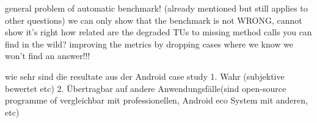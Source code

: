 general problem of automatic benchmark! (already mentioned but still applies to other questions)
    we can only show that the benchmark is not WRONG, cannot show it's right
how related are the degraded TUs to missing method calls you can find in the wild?
improving the metrics by dropping cases where we know we won't find an answer!!!

wie sehr sind die resultate aus der Android case study 1. Wahr (subjektive bewertet etc) 2. Übertragbar auf andere Anwendungsfälle(sind open-source programme of vergleichbar mit professionellen, Android eco System mit anderen, etc)


